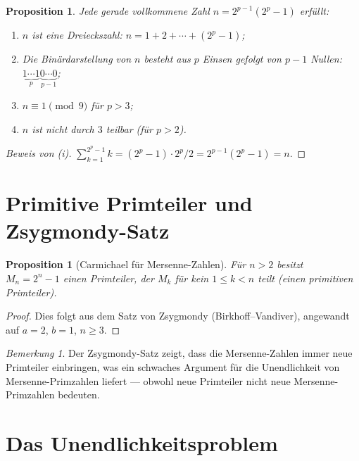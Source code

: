 \documentclass[12pt,a4paper]{amsart}
\newtheorem{proposition}[theorem]{Proposition}
\theoremstyle{definition}
\theoremstyle{remark}
\newtheorem{bemerkung}[theorem]{Bemerkung}
\begin{document}
\begin{proposition}
Jede gerade vollkommene Zahl $n = 2^{p-1}(2^p-1)$ erfüllt:
\begin{enumerate}[label=(\roman*)]
  \item $n$ ist eine Dreieckszahl: $n = 1 + 2 + \cdots + (2^p - 1)$;
  \item Die Binärdarstellung von $n$ besteht aus $p$ Einsen gefolgt von
        $p-1$ Nullen: $\underbrace{1\cdots1}_{p}\underbrace{0\cdots0}_{p-1}$;
  \item $n \equiv 1 \pmod{9}$ für $p > 3$;
  \item $n$ ist nicht durch $3$ teilbar (für $p > 2$).
\end{enumerate}
\end{proposition}

\begin{proof}[Beweis von (i)]
$\sum_{k=1}^{2^p-1} k = (2^p-1) \cdot 2^p / 2 = 2^{p-1}(2^p-1) = n$.
\end{proof}

\section{Primitive Primteiler und Zsygmondy-Satz}

\begin{proposition}[Carmichael für Mersenne-Zahlen]
Für $n > 2$ besitzt $M_n = 2^n - 1$ einen Primteiler, der $M_k$ für kein
$1 \leq k < n$ teilt (einen \emph{primitiven Primteiler}).
\end{proposition}

\begin{proof}
Dies folgt aus dem Satz von Zsygmondy (Birkhoff--Vandiver), angewandt auf
$a = 2$, $b = 1$, $n \geq 3$.
\end{proof}

\begin{bemerkung}
Der Zsygmondy-Satz zeigt, dass die Mersenne-Zahlen immer neue Primteiler
einbringen, was ein schwaches Argument für die Unendlichkeit von
Mersenne-Primzahlen liefert --- obwohl neue Primteiler nicht neue
Mersenne-Primzahlen bedeuten.
\end{bemerkung}

\section{Das Unendlichkeitsproblem}
\end{document}
